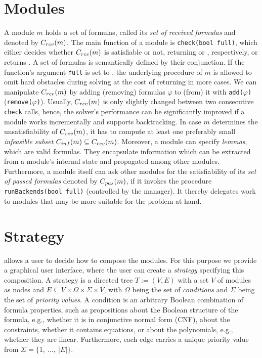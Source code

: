 \section{Modules}
A module $m$ holds a set of formulas, called its \emph{set of received formulas} and denoted by $C_{rcv}(m)$. The main function of a module is \texttt{check(bool full)}, which either decides whether $C_{rcv}(m)$ is satisfiable or not, returning \SAT or \UNSAT, respectively, or returns \UNKNOWN. A set of formulas is semantically defined by their conjunction. If the function's argument \texttt{full} is set to \false, the underlying procedure of $m$ is allowed to omit hard obstacles during solving at the cost of returning \UNKNOWN in more cases. We can manipulate $C_{rcv}(m)$ by adding (removing) formulas $\varphi$ to (from) it with \texttt{add($\varphi$)} (\texttt{remove($\varphi$)}). Usually, $C_{rcv}(m)$ is only slightly changed between two consecutive \texttt{check} calls, hence, the solver's performance can be significantly improved if a module works incrementally and supports backtracking. In case $m$ determines the unsatisfiability of $C_{rcv}(m)$, it has to compute at least one preferably small \emph{infeasible subset} $C_{inf}(m)\subseteq C_{rcv}(m)$. Moreover, a module can specify \emph{lemmas}, which are valid formulas. They encapsulate information which can be extracted from a module's internal state and propagated among other modules. Furthermore, a module itself can ask other modules for the satisfiability of its \emph{set of passed formulas} denoted by $C_{pas}(m)$, if it invokes the procedure \texttt{runBackends(bool full)} (controlled by the manager). It thereby delegates work to modules that	 may be more suitable for the problem at hand. 

\section{Strategy}
\smtrat allows a user to decide how to compose the modules. For this purpose we provide a graphical user interface, where the user can create a \emph{strategy} specifying this composition. A strategy is a directed tree $T:=(V, E)$ with a set $V$ of modules as nodes and $E\subseteq V\times \Omega\times\Sigma\times V$, with $\Omega$ being the set of \emph{conditions} and $\Sigma$ being the set of \emph{priority values}. A condition is an arbitrary Boolean combination of formula properties, such as propositions about the Boolean structure of the formula, e.g., whether it is in conjunctive normal form (CNF), about the constraints, \eg whether it contains equations, or about the polynomials, e.g., whether they are linear. Furthermore, each edge carries a unique priority value from $\Sigma=\{1,\ \ldots,\ |E|\}$.

